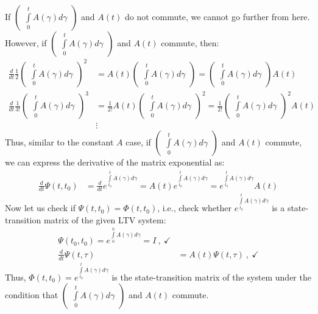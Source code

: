 \documentclass[twoside]{article}
\begin{document}
%
If $\begin{pmatrix} \int\limits_{0}^{t} A(\gamma) d\gamma \end{pmatrix}$ and $A(t)$ do not commute, we cannot go further from here. However, if $\begin{pmatrix} \int\limits_{0}^{t} A(\gamma) d\gamma \end{pmatrix}$ and $A(t)$ commute, then:
%
\begin{align*}
\frac{d}{dt} \frac{1}{2} \begin{pmatrix} \int\limits_{0}^{t} A(\gamma) d\gamma \end{pmatrix}^2 &=  A(t) \begin{pmatrix} \int\limits_{0}^{t} A(\gamma) d\gamma \end{pmatrix} 
= \begin{pmatrix} \int\limits_{0}^{t} A(\gamma) d\gamma \end{pmatrix} A(t) 
\\
\frac{d}{dt} \frac{1}{3 !} \begin{pmatrix} \int\limits_{0}^{t} A(\gamma) d\gamma \end{pmatrix}^3 &= \frac{1}{2 !}  A(t) \begin{pmatrix} \int\limits_{0}^{t} A(\gamma) d\gamma \end{pmatrix}^2
= \frac{1}{2 !} \begin{pmatrix} \int\limits_{0}^{t} A(\gamma) d\gamma \end{pmatrix}^2 A(t) 
\\
&\vdots
\end{align*}
%
Thus, similar to the constant $A$ case, if $\begin{pmatrix} \int\limits_{0}^{t} A(\gamma) d\gamma \end{pmatrix}$ and $A(t)$ commute, we can express the derivative of the matrix exponential as:
%
\begin{align*}
\frac{d}{dt} \Psi(t,t_0) &= \frac{d}{dt} e^{ \int\limits_{t_0}^{t} A(\gamma) d\gamma }  = A(t) e^{ \int\limits_{t_0}^{t} A(\gamma) d\gamma } = e^{ \int\limits_{t_0}^{t} A(\gamma) d\gamma } A(t)
\end{align*}
% 
Now let us check if $\Psi(t,t_0) = \Phi(t,t_0)$, i.e., check whether $e^{ \int\limits_{t_0}^{t} A(\gamma) d\gamma }$ is a state-transition matrix of the given LTV system:
%
\begin{align*}
\Psi(t_0,t_0) = e^{ \int\limits_{0}^{0} A(\gamma) d\gamma } = I \ , \ \checkmark
\\
\frac{d}{dt} \Psi(t,\tau) &= A(t) \Psi(t,\tau) \ , \ \checkmark
\end{align*}
%
Thus, $\Phi(t,t_0)  = e^{ \int\limits_{t_0}^{t} A(\gamma) d\gamma }$ is the state-transition matrix of the system under the condition that
$\begin{pmatrix} \int\limits_{0}^{t} A(\gamma) d\gamma \end{pmatrix}$ and $A(t)$ commute.
\end{document}
